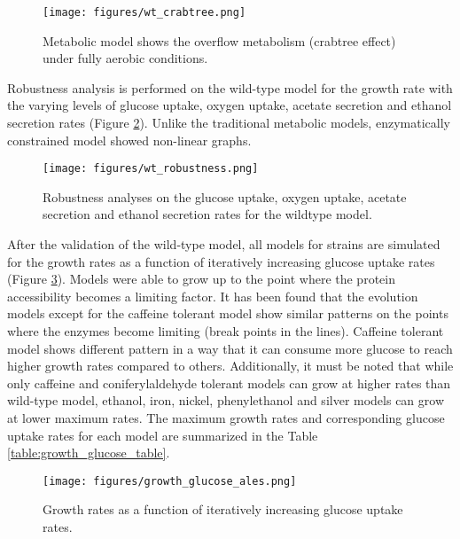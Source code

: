 \begin{figure}[H]
  \begin{center}
  \texttt{[image: figures/wt\_crabtree.png]}
  \caption[Metabolic model shows the overflow metabolism]{Metabolic model shows the overflow metabolism (crabtree effect) under fully aerobic conditions.}
  \label{fig:wt_crabtree}
  \end{center}
\end{figure}

Robustness analysis is performed on the wild-type model for the growth rate with the varying levels of glucose uptake, oxygen uptake, acetate secretion and ethanol secretion rates (Figure \ref{fig:wt_robustness}). Unlike the traditional metabolic models, enzymatically constrained model showed non-linear graphs.

\begin{figure}[H]
  \begin{center}
  \texttt{[image: figures/wt\_robustness.png]}
  \caption[Robustness analyses on the glucose uptake, oxygen uptake, acetate secretion and ethanol secretion rates for the wildtype model]{Robustness analyses on the glucose uptake, oxygen uptake, acetate secretion and ethanol secretion rates for the wildtype model.}
  \label{fig:wt_robustness}
  \end{center}
\end{figure}

After the validation of the wild-type model, all models for strains are simulated for the growth rates as a function of iteratively increasing glucose uptake rates (Figure \ref{fig:growth_glucose_ales}). Models were able to grow up to the point where the protein accessibility becomes a limiting factor. It has been found that the evolution models except for the caffeine tolerant model show similar patterns on the points where the enzymes become limiting (break points in the lines). Caffeine tolerant model shows different pattern in a way that it can consume more glucose to reach higher growth rates compared to others. Additionally, it must be noted that while only caffeine and coniferylaldehyde tolerant models can grow at higher rates than wild-type model, ethanol, iron, nickel, phenylethanol and silver models can grow at lower maximum rates. The maximum growth rates and corresponding glucose uptake rates for each model are summarized in the Table \ref{table:growth_glucose_table}.

\begin{figure}[H]
  \begin{center}
  \texttt{[image: figures/growth\_glucose\_ales.png]}
  \caption[Growth rates as a function of iteratively increasing glucose uptake rates]{Growth rates as a function of iteratively increasing glucose uptake rates.}
  \label{fig:growth_glucose_ales}
  \end{center}
  \end{figure}
\vspace{-1.0cm}

